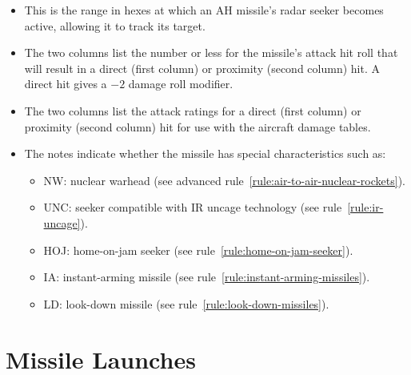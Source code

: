 {\begin{itemize}
    \item {} This is the range in hexes at which an AH missile’s radar seeker becomes active, allowing it to track its target.

    \item {} The two columns list the number or less for the missile’s attack hit roll that will result in a direct (first column) or proximity (second column) hit. A direct hit gives a $-2$ damage roll modifier.

    \item {} The two columns list the attack ratings for a direct (first column) or proximity (second column) hit for use with the aircraft damage tables.

    \item {} The notes indicate whether the missile has special characteristics such as:
    \begin{itemize}
        \item NW: nuclear warhead (see advanced rule~\ref{rule:air-to-air-nuclear-rockets}).
    \item UNC: seeker compatible with IR uncage technology (see rule~\ref{rule:ir-uncage}).
    \item HOJ: home-on-jam seeker (see rule~\ref{rule:home-on-jam-seeker}).
    \item IA: instant-arming missile (see rule~\ref{rule:instant-arming-missiles}).
    \item LD: look-down missile (see rule~\ref{rule:look-down-missiles}).
    
    \end{itemize}

\end{itemize}
}

\section{Missile Launches}
\label{rule:missile-launches}



